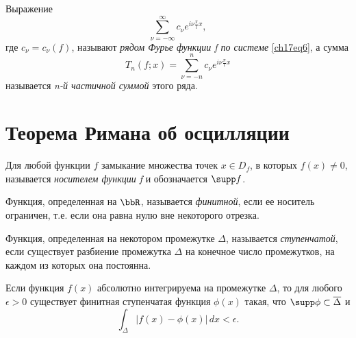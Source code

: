 \begin{defn}
Выражение
$$
\sum_{\nu = -\infty}^{\infty} c_{\nu}e^{i\nu\frac{\pi}{l}x},
$$
где $c_{\nu} = c_{\nu}(f)$, называют \textit{рядом Фурье функции f по системе} \eqref{ch17eq6}, а сумма
$$
T_{n}(f;x) = \sum_{\nu = -n}^{n} c_{\nu}e^{i\nu\frac{\pi}{l}x}
$$
называется \textit{n-й частичной суммой} этого ряда.
\end{defn}

\section{Теорема Римана об осцилляции}
\begin{defn}
Для любой функции $f$ замыкание множества точек $x \in D_{f}$, в которых $f(x) \neq 0$, называется \textit{носителем функции f} и обозначается $\supp f$.
\end{defn}
\begin{defn}
Функция, определенная на $\bbR$, называется \textit{финитной}, если ее носитель ограничен, т.е. если она равна нулю вне некоторого отрезка.
\end{defn}
\begin{defn}
Функция, определенная на некотором промежутке $\Delta$, называется \textit{ступенчатой}, если существует разбиение промежутка $\Delta$ на конечное число промежутков, на каждом из которых она постоянна.
\end{defn}
\begin{thm} \label{ch17thm1}
Если функция $f(x)$ абсолютно интегрируема на промежутке $\Delta$, то для любого $\epsilon > 0$ существует финитная ступенчатая функция $\phi(x)$ такая, что $\supp\phi \subset \overline{\Delta}$ и
\begin{equation} \label{ch17eq7}
\int_{\Delta} |f(x) - \phi(x)|\,dx < \epsilon.
\end{equation}
\end{thm}
